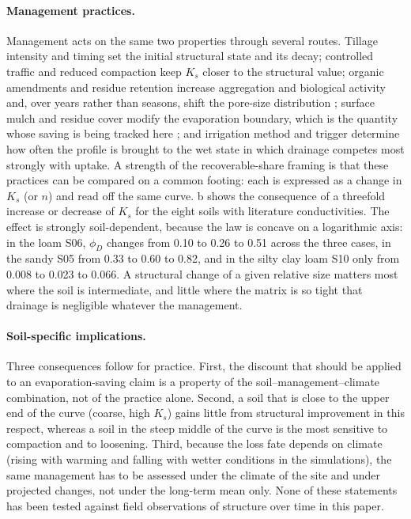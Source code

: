 \documentclass[preprint,12pt,authoryear]{elsarticle}
\begin{document}
\paragraph{Management practices.} Management acts on the same two properties through several routes. Tillage intensity and timing set the initial structural state and its decay; controlled traffic and reduced compaction keep $K_s$ closer to the structural value; organic amendments and residue retention increase aggregation and biological activity and, over years rather than seasons, shift the pore-size distribution \citep{Brady2016,Hillel1998}; surface mulch and residue cover modify the evaporation boundary, which is the quantity whose saving is being tracked here \citep{Vuaille2024,Leuther2026}; and irrigation method and trigger determine how often the profile is brought to the wet state in which drainage competes most strongly with uptake. A strength of the recoverable-share framing is that these practices can be compared on a common footing: each is expressed as a change in $K_s$ (or $n$) and read off the same curve. b shows the consequence of a threefold increase or decrease of $K_s$ for the eight soils with literature conductivities. The effect is strongly soil-dependent, because the law is concave on a logarithmic axis: in the loam S06, $\phi_D$ changes from 0.10 to 0.26 to 0.51 across the three cases, in the sandy S05 from 0.33 to 0.60 to 0.82, and in the silty clay loam S10 only from 0.008 to 0.023 to 0.066. A structural change of a given relative size matters most where the soil is intermediate, and little where the matrix is so tight that drainage is negligible whatever the management.

\paragraph{Soil-specific implications.} Three consequences follow for practice. First, the discount that should be applied to an evaporation-saving claim is a property of the soil--management--climate combination, not of the practice alone. Second, a soil that is close to the upper end of the curve (coarse, high $K_s$) gains little from structural improvement in this respect, whereas a soil in the steep middle of the curve is the most sensitive to compaction and to loosening. Third, because the loss fate depends on climate (rising with warming and falling with wetter conditions in the simulations), the same management has to be assessed under the climate of the site and under projected changes, not under the long-term mean only. None of these statements has been tested against field observations of structure over time in this paper.
\end{document}

